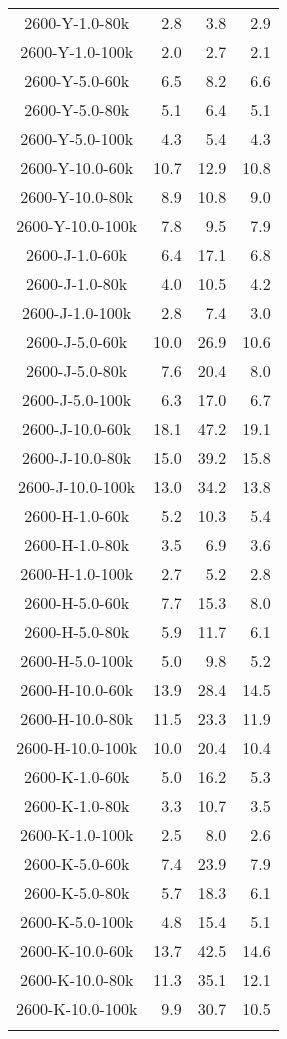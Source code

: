 \begin{longtable}{crrr}
    2600-Y-1.0-80k   &    2.8 &    3.8 &    2.9 \\
    2600-Y-1.0-100k  &    2.0 &    2.7 &    2.1 \\
    2600-Y-5.0-60k   &    6.5 &    8.2 &    6.6 \\
    2600-Y-5.0-80k   &    5.1 &    6.4 &    5.1 \\
    2600-Y-5.0-100k  &    4.3 &    5.4 &    4.3 \\
    2600-Y-10.0-60k  &   10.7 &   12.9 &   10.8 \\
    2600-Y-10.0-80k  &    8.9 &   10.8 &    9.0 \\
    2600-Y-10.0-100k &    7.8 &    9.5 &    7.9 \\
    2600-J-1.0-60k   &    6.4 &   17.1 &    6.8 \\
    2600-J-1.0-80k   &    4.0 &   10.5 &    4.2 \\
    2600-J-1.0-100k  &    2.8 &    7.4 &    3.0 \\
    2600-J-5.0-60k   &   10.0 &   26.9 &   10.6 \\
    2600-J-5.0-80k   &    7.6 &   20.4 &    8.0 \\
    2600-J-5.0-100k  &    6.3 &   17.0 &    6.7 \\
    2600-J-10.0-60k  &   18.1 &   47.2 &   19.1 \\
    2600-J-10.0-80k  &   15.0 &   39.2 &   15.8 \\
    2600-J-10.0-100k &   13.0 &   34.2 &   13.8 \\
    2600-H-1.0-60k   &    5.2 &   10.3 &    5.4 \\
    2600-H-1.0-80k   &    3.5 &    6.9 &    3.6 \\
    2600-H-1.0-100k  &    2.7 &    5.2 &    2.8 \\
    2600-H-5.0-60k   &    7.7 &   15.3 &    8.0 \\
    2600-H-5.0-80k   &    5.9 &   11.7 &    6.1 \\
    2600-H-5.0-100k  &    5.0 &    9.8 &    5.2 \\
    2600-H-10.0-60k  &   13.9 &   28.4 &   14.5 \\
    2600-H-10.0-80k  &   11.5 &   23.3 &   11.9 \\
    2600-H-10.0-100k &   10.0 &   20.4 &   10.4 \\
    2600-K-1.0-60k   &    5.0 &   16.2 &    5.3 \\
    2600-K-1.0-80k   &    3.3 &   10.7 &    3.5 \\
    2600-K-1.0-100k  &    2.5 &    8.0 &    2.6 \\
    2600-K-5.0-60k   &    7.4 &   23.9 &    7.9 \\
    2600-K-5.0-80k   &    5.7 &   18.3 &    6.1 \\
    2600-K-5.0-100k  &    4.8 &   15.4 &    5.1 \\
    2600-K-10.0-60k  &   13.7 &   42.5 &   14.6 \\
    2600-K-10.0-80k  &   11.3 &   35.1 &   12.1 \\
    2600-K-10.0-100k &    9.9 &   30.7 &   10.5 \\
    \label{tab:spirou_precisions}
\end{longtable}



